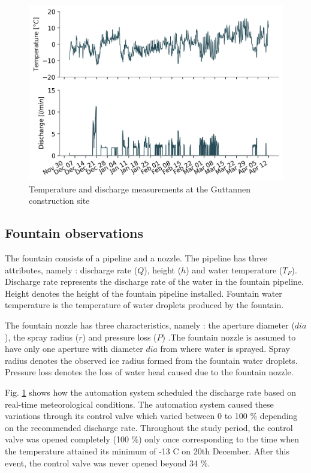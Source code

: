 \documentclass[tc, manuscript]{copernicus}
\begin{document}
\begin{figure}[t]
\includegraphics[width=12cm]{Figures/disvstemp.png}
\caption{Temperature and discharge measurements at the Guttannen construction site}
\label{fig:aws} 
\end{figure}


\subsection{Fountain observations}

The fountain consists of a pipeline and a nozzle. The pipeline has three attributes, namely : discharge rate
($Q$), height ($h$) and water temperature ($T_F$). Discharge rate represents the discharge rate of the water in
the fountain pipeline. Height denotes the height of the fountain pipeline installed. Fountain water temperature
is the temperature of water droplets produced by the fountain.

The fountain nozzle has three characteristics, namely : the aperture diameter ($dia$), the spray radius ($r$)
and pressure loss ($P$) .The fountain nozzle is assumed to have only one aperture with diameter $dia$ from where
water is sprayed. Spray radius denotes the observed ice radius formed from the fountain water droplets.
Pressure loss denotes the loss of water head caused due to the fountain nozzle.

Fig. \ref{fig:aws} shows how the automation system scheduled the discharge rate based on real-time
meteorological conditions. The automation system caused these variations through its control valve which varied
between 0 to 100 \% depending on the recommended discharge rate. Throughout the study period, the control valve
was opened completely (100 \%) only once corresponding to the time when the temperature attained its minimum of
-13 \degree C on 20th December. After this event, the control valve was never opened beyond 34 \%.  
\end{document}

